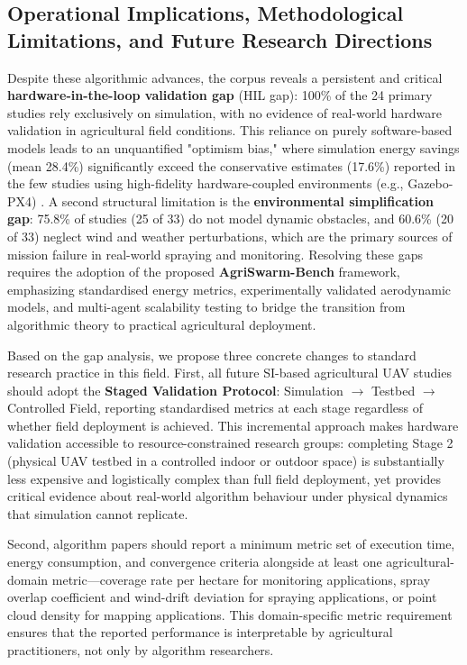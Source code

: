 \documentclass[review,3p,times]{elsarticle}
\begin{document}
\begin{itemize}
{\subsection{Operational Implications, Methodological Limitations, and Future Research Directions}

Despite these algorithmic advances, the corpus reveals a persistent and critical \textbf{hardware-in-the-loop validation gap} (HIL gap): 100\% of the 24 primary studies rely exclusively on simulation, with no evidence of real-world hardware validation in agricultural field conditions. This reliance on purely software-based models leads to an unquantified "optimism bias," where simulation energy savings (mean 28.4\%) significantly exceed the conservative estimates (17.6\%) reported in the few studies using high-fidelity hardware-coupled environments (e.g., Gazebo-PX4) \cite{li2023,rao2024}. A second structural limitation is the \textbf{environmental simplification gap}: 75.8\% of studies (25 of 33) do not model dynamic obstacles, and 60.6\% (20 of 33) neglect wind and weather perturbations, which are the primary sources of mission failure in real-world spraying and monitoring. Resolving these gaps requires the adoption of the proposed \textbf{AgriSwarm-Bench} framework, emphasizing standardised energy metrics, experimentally validated aerodynamic models, and multi-agent scalability testing to bridge the transition from algorithmic theory to practical agricultural deployment.

Based on the gap analysis, we propose three concrete changes to standard research practice in this field. First, all future SI-based agricultural UAV studies should adopt the \textbf{Staged Validation Protocol}: Simulation $\rightarrow$ Testbed $\rightarrow$ Controlled Field, reporting standardised metrics at each stage regardless of whether field deployment is achieved. This incremental approach makes hardware validation accessible to resource-constrained research groups: completing Stage 2 (physical UAV testbed in a controlled indoor or outdoor space) is substantially less expensive and logistically complex than full field deployment, yet provides critical evidence about real-world algorithm behaviour under physical dynamics that simulation cannot replicate.

Second, algorithm papers should report a minimum metric set of execution time, energy consumption, and convergence criteria alongside at least one agricultural-domain metric---coverage rate per hectare for monitoring applications, spray overlap coefficient and wind-drift deviation for spraying applications, or point cloud density for mapping applications. This domain-specific metric requirement ensures that the reported performance is interpretable by agricultural practitioners, not only by algorithm researchers.

}
\end{itemize}
\end{document}
